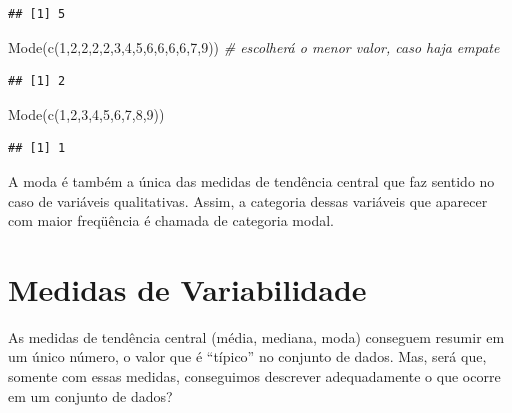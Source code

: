 \documentclass[
]{book}
\newenvironment{Shaded}{\begin{snugshade}}{\end{snugshade}}
\newcommand{\CommentTok}[1]{\textcolor[rgb]{0.56,0.35,0.01}{\textit{#1}}}
\newcommand{\DecValTok}[1]{\textcolor[rgb]{0.00,0.00,0.81}{#1}}
\newcommand{\FunctionTok}[1]{\textcolor[rgb]{0.00,0.00,0.00}{#1}}
\newcommand{\NormalTok}[1]{#1}
\begin{document}
\begin{verbatim}
## [1] 5
\end{verbatim}

\begin{Shaded}
\begin{Highlighting}[]
\FunctionTok{Mode}\NormalTok{(}\FunctionTok{c}\NormalTok{(}\DecValTok{1}\NormalTok{,}\DecValTok{2}\NormalTok{,}\DecValTok{2}\NormalTok{,}\DecValTok{2}\NormalTok{,}\DecValTok{2}\NormalTok{,}\DecValTok{3}\NormalTok{,}\DecValTok{4}\NormalTok{,}\DecValTok{5}\NormalTok{,}\DecValTok{6}\NormalTok{,}\DecValTok{6}\NormalTok{,}\DecValTok{6}\NormalTok{,}\DecValTok{6}\NormalTok{,}\DecValTok{7}\NormalTok{,}\DecValTok{9}\NormalTok{)) }\CommentTok{\# escolherá o menor valor, caso haja empate}
\end{Highlighting}
\end{Shaded}

\begin{verbatim}
## [1] 2
\end{verbatim}

\begin{Shaded}
\begin{Highlighting}[]
\FunctionTok{Mode}\NormalTok{(}\FunctionTok{c}\NormalTok{(}\DecValTok{1}\NormalTok{,}\DecValTok{2}\NormalTok{,}\DecValTok{3}\NormalTok{,}\DecValTok{4}\NormalTok{,}\DecValTok{5}\NormalTok{,}\DecValTok{6}\NormalTok{,}\DecValTok{7}\NormalTok{,}\DecValTok{8}\NormalTok{,}\DecValTok{9}\NormalTok{))}
\end{Highlighting}
\end{Shaded}

\begin{verbatim}
## [1] 1
\end{verbatim}

A moda é também a única das medidas de tendência central que faz sentido no caso de variáveis qualitativas. Assim, a categoria dessas variáveis que aparecer com maior freqüência é chamada de categoria modal.

\hypertarget{medidas-de-variabilidade}{%
\section{Medidas de Variabilidade}\label{medidas-de-variabilidade}}

As medidas de tendência central (média, mediana, moda) conseguem resumir em um único número, o valor que é ``típico'' no conjunto de dados. Mas, será que, somente com essas medidas, conseguimos descrever adequadamente o que ocorre em um conjunto de dados?
\end{document}
